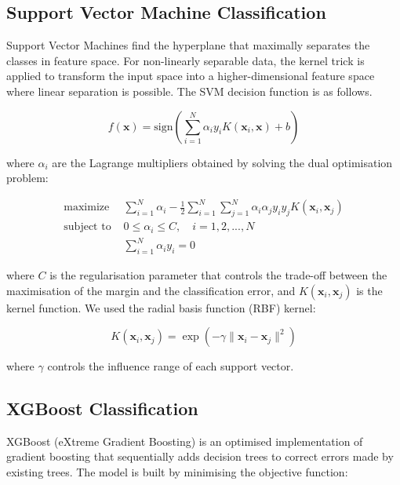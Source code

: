 \subsection{Support Vector Machine Classification}

Support Vector Machines find the hyperplane that maximally separates the classes in feature space. For non-linearly separable data, the kernel trick is applied to transform the input space into a higher-dimensional feature space where linear separation is possible. The SVM decision function is as follows.

\begin{equation}
f(\mathbf{x}) = \text{sign}\left(\sum_{i=1}^{N} \alpha_i y_i K(\mathbf{x}_i, \mathbf{x}) + b\right)
\end{equation}

where $\alpha_i$ are the Lagrange multipliers obtained by solving the dual optimisation problem:

\begin{equation}
\begin{aligned}
\text{maximize } & \sum_{i=1}^{N} \alpha_i - \frac{1}{2} \sum_{i=1}^{N} \sum_{j=1}^{N} \alpha_i \alpha_j y_i y_j K(\mathbf{x}_i, \mathbf{x}_j) \\
\text{subject to } & 0 \leq \alpha_i \leq C, \quad i = 1, 2, ..., N \\
& \sum_{i=1}^{N} \alpha_i y_i = 0
\end{aligned}
\end{equation}

where $C$ is the regularisation parameter that controls the trade-off between the maximisation of the margin and the classification error, and $K(\mathbf{x}_i, \mathbf{x}_j)$ is the kernel function. We used the radial basis function (RBF) kernel:

\begin{equation}
K(\mathbf{x}_i, \mathbf{x}_j) = \exp\left(-\gamma \|\mathbf{x}_i - \mathbf{x}_j\|^2\right)
\end{equation}

where $\gamma$ controls the influence range of each support vector.

\subsection{XGBoost Classification}

XGBoost (eXtreme Gradient Boosting) is an optimised implementation of gradient boosting that sequentially adds decision trees to correct errors made by existing trees. The model is built by minimising the objective function:

